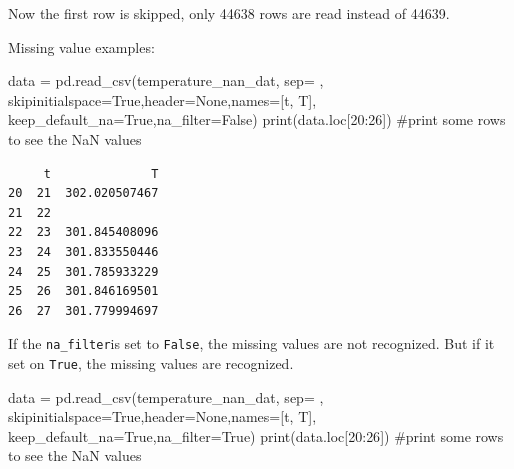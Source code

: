 \documentclass[
  letterpaper,
  DIV=11,
  numbers=noendperiod]{scrreprt}
\newenvironment{Shaded}{\begin{snugshade}}{\end{snugshade}}
\newcommand{\BuiltInTok}[1]{\textcolor[rgb]{0.00,0.23,0.31}{#1}}
\newcommand{\CommentTok}[1]{\textcolor[rgb]{0.37,0.37,0.37}{#1}}
\newcommand{\DecValTok}[1]{\textcolor[rgb]{0.68,0.00,0.00}{#1}}
\newcommand{\NormalTok}[1]{\textcolor[rgb]{0.00,0.23,0.31}{#1}}
\newcommand{\OperatorTok}[1]{\textcolor[rgb]{0.37,0.37,0.37}{#1}}
\newcommand{\StringTok}[1]{\textcolor[rgb]{0.13,0.47,0.30}{#1}}
\newcommand{\VariableTok}[1]{\textcolor[rgb]{0.07,0.07,0.07}{#1}}
\begin{document}
Now the first row is skipped, only 44638 rows are read instead of 44639.

Missing value examples:

\begin{Shaded}
\begin{Highlighting}[]
\NormalTok{data }\OperatorTok{=}\NormalTok{ pd.read\_csv(temperature\_nan\_dat, sep}\OperatorTok{=}\StringTok{\textquotesingle{} \textquotesingle{}}\NormalTok{, skipinitialspace}\OperatorTok{=}\VariableTok{True}\NormalTok{,header}\OperatorTok{=}\VariableTok{None}\NormalTok{,names}\OperatorTok{=}\NormalTok{[}\StringTok{\textquotesingle{}t\textquotesingle{}}\NormalTok{, }\StringTok{\textquotesingle{}T\textquotesingle{}}\NormalTok{],  keep\_default\_na}\OperatorTok{=}\VariableTok{True}\NormalTok{,na\_filter}\OperatorTok{=}\VariableTok{False}\NormalTok{)}
\BuiltInTok{print}\NormalTok{(data.loc[}\DecValTok{20}\NormalTok{:}\DecValTok{26}\NormalTok{]) }\CommentTok{\#print some rows to see the NaN values}
\end{Highlighting}
\end{Shaded}

\begin{verbatim}
     t              T
20  21  302.020507467
21  22               
22  23  301.845408096
23  24  301.833550446
24  25  301.785933229
25  26  301.846169501
26  27  301.779994697
\end{verbatim}

If the \texttt{na\_filter}is set to \texttt{False}, the missing values
are not recognized. But if it set on \texttt{True}, the missing values
are recognized.

\begin{Shaded}
\begin{Highlighting}[]
\NormalTok{data }\OperatorTok{=}\NormalTok{ pd.read\_csv(temperature\_nan\_dat, sep}\OperatorTok{=}\StringTok{\textquotesingle{} \textquotesingle{}}\NormalTok{, skipinitialspace}\OperatorTok{=}\VariableTok{True}\NormalTok{,header}\OperatorTok{=}\VariableTok{None}\NormalTok{,names}\OperatorTok{=}\NormalTok{[}\StringTok{\textquotesingle{}t\textquotesingle{}}\NormalTok{, }\StringTok{\textquotesingle{}T\textquotesingle{}}\NormalTok{],  keep\_default\_na}\OperatorTok{=}\VariableTok{True}\NormalTok{,na\_filter}\OperatorTok{=}\VariableTok{True}\NormalTok{)}
\BuiltInTok{print}\NormalTok{(data.loc[}\DecValTok{20}\NormalTok{:}\DecValTok{26}\NormalTok{]) }\CommentTok{\#print some rows to see the NaN values}
\end{Highlighting}
\end{Shaded}
\end{document}
